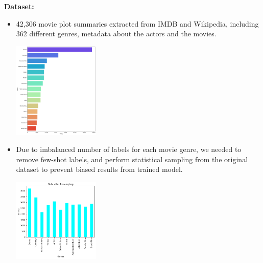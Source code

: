 \documentclass[hbrs-poster.tex]{subfiles}
\begin{document}
{        
        \textbf{Dataset:}
        \begin{itemize}
            \item 42,306 movie plot summaries extracted from IMDB and Wikipedia,
            including 362 different genres, metadata about the actors and the movies. 
            \begin{tikzfigure}
                \includegraphics[width=0.325\textwidth, height=0.17\textheight]{figures/output.png}
            \end{tikzfigure}
            \item Due to imbalanced number of labels for each movie genre, we needed to remove few-shot labels, and perform statistical sampling from the original dataset to prevent biased results from trained model.
            \begin{tikzfigure}
                \includegraphics[width=0.325\textwidth, height=0.12\textheight]{figures/output2.png}
            \end{tikzfigure}
        \end{itemize}    
    }
\end{document}
